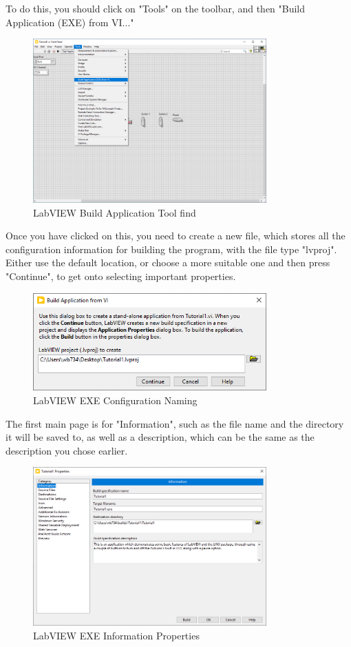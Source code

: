 \documentclass[a4paper,11pt]{report}
\begin{document}
To do this, you should click on "Tools" on the toolbar, and then "Build Application (EXE) from VI..."

\begin{figure}[H]
\centering
\includegraphics[width=0.8\textwidth]{screenshots/labview39}
\caption{LabVIEW Build Application Tool find}
\end{figure}

Once you have clicked on this, you need to create a new file, which stores all the configuration information for building the program, with the file type "lvproj". Either use the default location, or choose a more suitable one and then press "Continue", to get onto selecting important properties.

\begin{figure}[H]
\centering
\includegraphics[width=0.8\textwidth]{screenshots/labview40}
\caption{LabVIEW EXE Configuration Naming}
\end{figure}

The first main page is for "Information", such as the file name and the directory it will be saved to, as well as a description, which can be the same as the description you chose earlier.

\begin{figure}[H]
\centering
\includegraphics[width=0.8\textwidth]{screenshots/labview41}
\caption{LabVIEW EXE Information Properties}
\end{figure}
\end{document}
